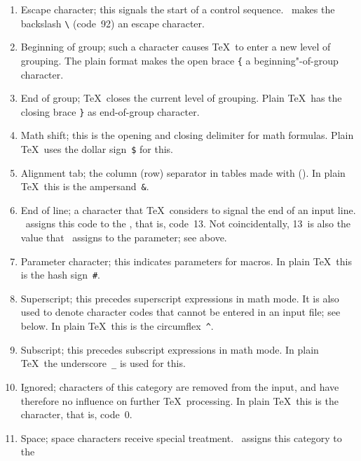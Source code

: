 \documentclass{book}
\begin{document}
\begin{enumerate} %
\setcounter{enumi}{-1}
\item\label{ini:esc} Escape character; this signals
  the start of a control sequence. \IniTeX\ makes the backslash
  \verb-\- (code~92) an escape character.
\item{} Beginning of group; such a character causes
  \TeX\ to enter a new level of grouping. The plain format makes the
  open brace \verb-{- \mdqon a beginning"-of-group character.  \mdqoff
\item{} End of group; \TeX\ closes the current level
  of grouping.  Plain \TeX\ has the closing brace \verb-}- as
  end-of-group character.
\item{} Math shift; this is the opening and closing
  delimiter for math formulas. Plain \TeX\ uses the dollar
  sign~\verb-$- for this.
\item{} Alignment tab; the column (row) separator in
  tables made with  (). In plain \TeX\ this is
  the ampersand~\verb-&-.
\item{}\label{ini:eol} End of line; a character that
  \TeX\ considers to signal the end of an input line.
  \IniTeX\ assigns this code to the , that is, code~13.
  Not coincidentally, 13~is also the value that \IniTeX\ assigns to
  the  parameter; see above.
\item{} Parameter character; this indicates parameters
  for macros.  In plain \TeX\ this is the hash sign~\verb-#-.
\item{} Superscript; this precedes superscript
  expressions in math mode. It is also used to denote character codes
  that cannot be entered in an input file; see below.  In plain
  \TeX\ this is the circumflex~\verb-^-.
\item{} Subscript; this precedes subscript expressions
  in math mode.  In plain \TeX\ the underscore~\verb-_- is used for
  this.
\item{} Ignored; characters of this category are
  removed from the input, and have therefore no influence on further
  \TeX\ processing. In plain \TeX\ this is the  character,
  that is, code~0.
\item{}\label{ini:sp} Space; space characters receive
  special treatment.  \IniTeX\ assigns this category to the \ascii{}

\end{enumerate}
\end{document}
